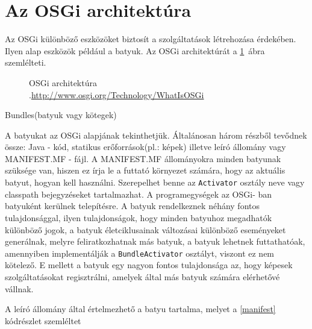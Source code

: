 \section{Az OSGi architektúra}\label{sec:OSGI_architektura}

Az OSGi különböző eszközöket biztosít a szolgáltatások létrehozása érdekében. Ilyen alap eszközök például a batyuk\cite{batyu}. Az OSGi architektúrát a \ref{fig:osgiArchitektura}~ábra szemlélteti.

\begin{figure}[t]
  \centering
  \caption[OSGi architektura]%
  {OSGi architektúra\\
  {\white .}\hfill\url{http://www.osgi.org/Technology/WhatIsOSGi}}
  \label{fig:osgiArchitektura}
\end{figure}

Bundles(batyuk vagy kötegek)

A batyukat az OSGi alapjának tekinthetjük. Általánosan három részből tevődnek össze: Java - kód, statikus erőforrások(pl.: képek) illetve leíró állomány vagy MANIFEST.MF - fájl. A MANIFEST.MF állományokra minden batyunak szüksége van, hiszen ez írja le a futtató környezet számára, hogy az aktuális batyut, hogyan kell használni. Szerepelhet benne az \texttt{Activator} osztály neve vagy classpath bejegyzéseket tartalmazhat. A programegységek az OSGi- ban batyuként kerülnek telepítésre. A batyuk rendelkeznek néhány fontos tulajdonsággal, ilyen tulajdonságok, hogy minden batyuhoz megadhatók különböző jogok, a batyuk életciklusainak változásai különböző eseményeket generálnak, melyre feliratkozhatnak más batyuk, a batyuk lehetnek futtathatóak, amennyiben implementálják a \texttt{BundleActivator} osztályt, viszont ez nem kötelező. E mellett a batyuk egy nagyon fontos tulajdonsága az, hogy képesek szolgáltatásokat regisztrálni, amelyek által más batyuk számára elérhetővé vállnak.

A leíró állomány által értelmezhető a batyu tartalma, melyet a \ref{manifest} kódrészlet szemléltet
% 
\lstset{
  numbers=left,
  stepnumber=1,    
  firstnumber=1,
  numberfirstline=true
}

 
